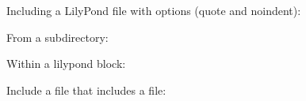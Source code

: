 \documentclass{article}
\begin{document}
Including a LilyPond file with options (quote and noindent):

\begin{quote}
{%
\parindent 0pt
\noindent
\ifx\preLilyPondExample \undefined
\else
  \expandafter\preLilyPondExample
\fi
\def\lilypondbook{}%

\ifx\postLilyPondExample \undefined
\else
  \expandafter\postLilyPondExample
\fi
}
\end{quote}

From a subdirectory:

\begin{quote}
{%
\parindent 0pt
\noindent
\ifx\preLilyPondExample \undefined
\else
  \expandafter\preLilyPondExample
\fi
\def\lilypondbook{}%

\ifx\postLilyPondExample \undefined
\else
  \expandafter\postLilyPondExample
\fi
}
\end{quote}

Within a lilypond block:

\begin{quote}
{%
\parindent 0pt
\noindent
\ifx\preLilyPondExample \undefined
\else
  \expandafter\preLilyPondExample
\fi
\def\lilypondbook{}%

\ifx\postLilyPondExample \undefined
\else
  \expandafter\postLilyPondExample
\fi
}
\end{quote}

Include a file that includes a file:

\begin{quote}
{%
\parindent 0pt
\noindent
\ifx\preLilyPondExample \undefined
\else
  \expandafter\preLilyPondExample
\fi
\def\lilypondbook{}%

\ifx\postLilyPondExample \undefined
\else
  \expandafter\postLilyPondExample
\fi
}
\end{quote}
\end{document}
